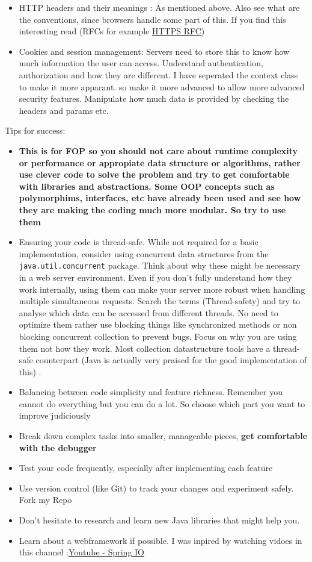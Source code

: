 \documentclass{article}
\begin{document}
\begin{itemize}
    \item HTTP headers and their meanings : As mentioned above. Also see what are the conventions, since browsers handle some part of this. If you find this interesting read (RFCs for example \href{https://datatracker.ietf.org/doc/html/rfc2818}{HTTPS RFC})
    \item Cookies and session management: Servers need to store this to know how much information the user can access. Understand authentication, authorization and how they are different. I have seperated the context class to make it more apparant. so make it more advanced to allow more advanced security features. Manipulate how much data is provided by checking the headers and params etc.
\end{itemize}


Tips for success:
\begin{itemize}
    \item \textbf{This is for FOP so you should not care about runtime complexity or performance or appropiate data structure or algorithms, rather use clever code to solve the problem and try to get comfortable with libraries and abstractions. Some OOP concepts such as polymorphims, interfaces, etc have already been used and see how they are making the coding much more modular. So try to use them}
    \item Ensuring your code is thread-safe. While not required for a basic implementation, consider using concurrent data structures from the \texttt{java.util.concurrent} package. Think about why these might be necessary in a web server environment. Even if you don't fully understand how they work internally, using them can make your server more robust when handling multiple simultaneous requests. Search the terms (Thread-safety) and try to analyse which data can be accessed from different threads. No need to optimize them rather use blocking things like synchronized methods or non blocking concurrent collection to prevent bugs. Focus on why you are using them not how they work. Most collection datastructure tools have a thread-safe counterpart (Java is actually very praised for the good implementation of this) . 
    \item Balancing between code simplicity and feature richness. Remember you cannot do everything but you can do a lot. So choose which part you want to improve judiciously
    \item Break down complex tasks into smaller, manageable pieces, \textbf{get comfortable with the debugger}
    \item Test your code frequently, especially after implementing each feature
    \item Use version control (like Git) to track your changes and experiment safely. Fork my Repo
    \item Don't hesitate to research and learn new Java libraries that might help you. 
    \item Learn about a webframework if possible. I was inpired by watching vidoes in this channel :\href{https://www.youtube.com/@SpringIOConference}{Youtube - Spring IO}
\end{itemize}
\end{document}

